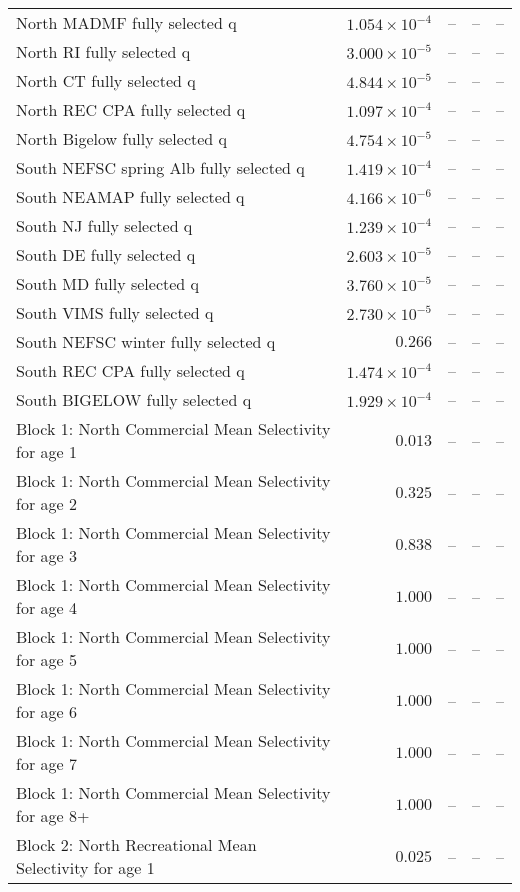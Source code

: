 \documentclass[
]{article}
\begin{document}
\begin{landscape}
\begin{longtable}[t]{lrrrr}
North MADMF fully selected q & $1.054\times 10^{-4}$ & -- & -- & --\\
North RI fully selected q & $3.000\times 10^{-5}$ & -- & -- & --\\
North CT fully selected q & $4.844\times 10^{-5}$ & -- & -- & --\\
\addlinespace
North REC CPA fully selected q & $1.097\times 10^{-4}$ & -- & -- & --\\
North Bigelow fully selected q & $4.754\times 10^{-5}$ & -- & -- & --\\
South NEFSC spring Alb fully selected q & $1.419\times 10^{-4}$ & -- & -- & --\\
South NEAMAP fully selected q & $4.166\times 10^{-6}$ & -- & -- & --\\
South NJ fully selected q & $1.239\times 10^{-4}$ & -- & -- & --\\
\addlinespace
South DE fully selected q & $2.603\times 10^{-5}$ & -- & -- & --\\
South MD fully selected q & $3.760\times 10^{-5}$ & -- & -- & --\\
South VIMS fully selected q & $2.730\times 10^{-5}$ & -- & -- & --\\
South NEFSC winter fully selected q & $0.266$ & -- & -- & --\\
South REC CPA fully selected q & $1.474\times 10^{-4}$ & -- & -- & --\\
\addlinespace
South BIGELOW fully selected q & $1.929\times 10^{-4}$ & -- & -- & --\\
Block 1: North Commercial Mean Selectivity for age 1 & $0.013$ & -- & -- & --\\
Block 1: North Commercial Mean Selectivity for age 2 & $0.325$ & -- & -- & --\\
Block 1: North Commercial Mean Selectivity for age 3 & $0.838$ & -- & -- & --\\
Block 1: North Commercial Mean Selectivity for age 4 & $1.000$ & -- & -- & --\\
\addlinespace
Block 1: North Commercial Mean Selectivity for age 5 & $1.000$ & -- & -- & --\\
Block 1: North Commercial Mean Selectivity for age 6 & $1.000$ & -- & -- & --\\
Block 1: North Commercial Mean Selectivity for age 7 & $1.000$ & -- & -- & --\\
Block 1: North Commercial Mean Selectivity for age 8+ & $1.000$ & -- & -- & --\\
Block 2: North Recreational Mean Selectivity for age 1 & $0.025$ & -- & -- & --\\

\end{longtable}
\end{landscape}
\end{document}
